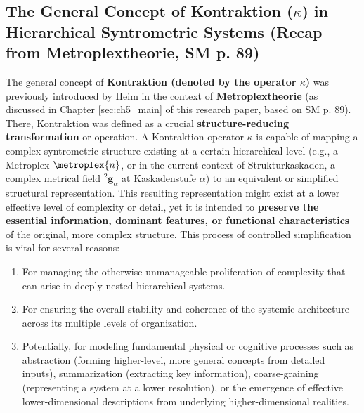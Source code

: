 \documentclass[
    12pt,              %
    a4paper,           %
    headings=normal,   %
    twoside=true,      %
    BCOR=8mm,          %
]{scrbook}
\newcommand{\kompositionsfeld}{{}^2\mathbf{g}}
\newcommand{\kaskadenstufe}{\alpha}
\begin{document}
\subsection{The General Concept of Kontraktion (\(\kappa\)) in Hierarchical Syntrometric Systems (Recap from Metroplextheorie, SM p. 89)}
\label{sec:ch9_3_1_kontraktion_recap}
The general concept of \textbf{Kontraktion (denoted by the operator \(\kappa \))} was previously introduced by Heim in the context of \textbf{Metroplextheorie} (as discussed in Chapter \ref{sec:ch5_main} of this research paper, based on SM p. 89). There, Kontraktion was defined as a crucial \textbf{structure-reducing transformation} or operation. A Kontraktion operator \(\kappa\) is capable of mapping a complex syntrometric structure existing at a certain hierarchical level (e.g., a Metroplex \(\metroplex{n}\), or in the current context of Strukturkaskaden, a complex metrical field \(\kompositionsfeld_\alpha\) at Kaskadenstufe \(\kaskadenstufe\)) to an equivalent or simplified structural representation. This resulting representation might exist at a lower effective level of complexity or detail, yet it is intended to \textbf{preserve the essential information, dominant features, or functional characteristics} of the original, more complex structure. This process of controlled simplification is vital for several reasons:
\begin{enumerate}[label=\arabic*.]
    \item  For managing the otherwise unmanageable proliferation of complexity that can arise in deeply nested hierarchical systems.
    \item  For ensuring the overall stability and coherence of the systemic architecture across its multiple levels of organization.
    \item  Potentially, for modeling fundamental physical or cognitive processes such as abstraction (forming higher-level, more general concepts from detailed inputs), summarization (extracting key information), coarse-graining (representing a system at a lower resolution), or the emergence of effective lower-dimensional descriptions from underlying higher-dimensional realities.
\end{enumerate}
\end{document}
